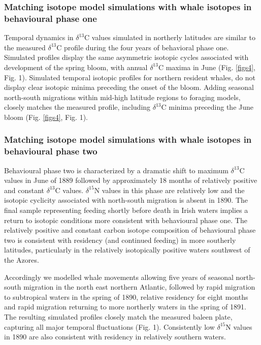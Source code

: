 \documentclass[a4paper,12pt]{article}
\begin{document}
\subsubsection*{Matching isotope model simulations with whale isotopes in behavioural phase one}
Temporal dynamics in $\delta^{13}$C values simulated in northerly latitudes are similar to the measured $\delta^{13}$C profile during the four years of behavioral phase one. 
Simulated profiles display the same asymmetric isotopic cycles associated with development of the spring bloom, with annual $\delta^{13}$C maxima in June (Fig. \ref{figs4}, Fig. 1). 
Simulated temporal isotopic profiles for northern resident whales, do not display clear isotopic minima preceding the onset of the bloom. 
Adding seasonal north-south migrations within mid-high latitude regions to foraging models, closely matches the measured profile, including $\delta^{13}$C minima preceding the June bloom (Fig. \ref{figs4}, Fig. 1).
 
\subsubsection*{Matching isotope model simulations with whale isotopes in behavioural phase two}
Behavioural phase two is characterized by a dramatic shift to maximum $\delta^{13}$C values in June of 1889 followed by approximately 18 months of relatively positive and constant $\delta^{13}$C values. 
$\delta^{15}$N values in this phase are relatively low and the isotopic cyclicity associated with north-south migration is absent in 1890. 
The final sample representing feeding shortly before death in Irish waters implies a return to isotopic conditions more consistent with behavioural phase one. 
The relatively positive and constant carbon isotope composition of behavioural phase two is consistent with residency (and continued feeding) in more southerly latitudes, particularly in the relatively isotopically positive waters southwest of the Azores.
 
Accordingly we modelled whale movements allowing five years of seasonal north-south migration in the north east northern Atlantic, followed by rapid migration to subtropical waters in the spring of 1890, relative residency for eight months and rapid migration returning to more northerly waters in the spring of 1891.
The resulting simulated profiles closely match the measured baleen plate, capturing all major temporal fluctuations (Fig. 1). 
Consistently low $\delta^{15}$N values in 1890 are also consistent with residency in relatively southern waters. 
 
\end{document}
